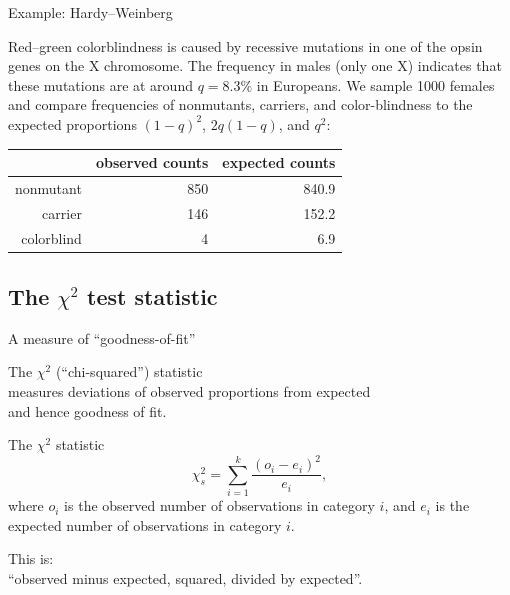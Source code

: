 \begin{frame}{Example: Hardy--Weinberg}

    Red--green colorblindness is caused by recessive mutations in one of the opsin genes on the X chromosome.
    The frequency in males (only one X) indicates that these mutations are at around $q=8.3\%$ in Europeans.
    We sample 1000 females and compare frequencies of nonmutants, carriers, and color-blindness to the expected proportions $(1-q)^2$, $2q(1-q)$, and $q^2$:
    \begin{center}
        \begin{tabular}{r|rr}
            & observed counts & expected counts \\
            \hline 
            nonmutant & 850 & 840.9 \\ 
            carrier &  146 & 152.2 \\ 
            colorblind & 4 & 6.9  
        \end{tabular}
    \end{center}


\end{frame}


\subsection{The $\chi^2$ test statistic}

\begin{frame}{A measure of ``goodness-of-fit''}

  The $\chi^2$ (``chi-squared'') statistic \\
  measures deviations of observed proportions from expected \\
  and hence \alert{goodness of fit}.

    \begin{block}{The $\chi^2$ statistic}
        \[ \chi^2_s = \sum_{i=1}^k \frac{(o_i - e_i)^2}{e_i} , \]
        where $o_i$ is the observed \alert{number} of observations in category $i$,
        and $e_i$ is the expected \alert{number} of observations in category $i$.
    \end{block}


    \vspace{2em}

    This is:\\
    \hspace{2em} \alert{``observed minus expected, squared, divided by expected''}.


\end{frame}


